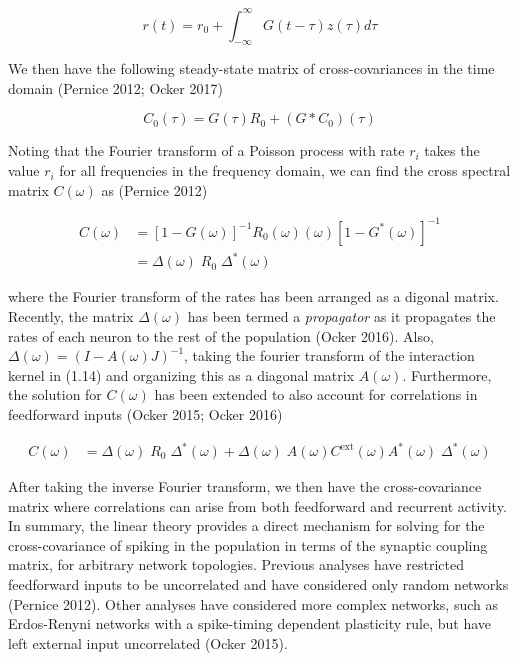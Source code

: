 \documentclass{ucetd}
\begin{document}
\begin{equation}
r(t) = r_{0} + \int_{-\infty}^{\infty} G(t-\tau)z(\tau)d\tau
\end{equation}

We then have the following steady-state matrix of cross-covariances in the time domain (Pernice 2012; Ocker 2017)

\begin{equation}
C_{0}(\tau) = G(\tau)R_{0} + (G*C_{0})(\tau)
\end{equation} 

Noting that the Fourier transform of a Poisson process with rate $r_{i}$ takes the value $r_{i}$ for all frequencies in the frequency domain, we can find the cross spectral matrix $C(\omega)$ as (Pernice 2012)

\begin{align}
C(\omega) &= [1-G(\omega)]^{-1}R_{0}(\omega)(\omega)[1-G^{*}(\omega)]^{-1}\\
&= \Delta(\omega)\;R_{0}\;\Delta^{*}(\omega)
\end{align} 

where the Fourier transform of the rates has been arranged as a digonal matrix. Recently, the matrix $\Delta(\omega)$ has been termed a \emph{propagator} as it propagates the rates of each neuron to the rest of the population (Ocker 2016). Also, $\Delta(\omega) = (I - A(\omega)J)^{-1}$, taking the fourier transform of the interaction kernel in (1.14) and organizing this as a diagonal matrix $A(\omega)$. Furthermore, the solution for $C(\omega)$ has been extended to also account for correlations in feedforward inputs (Ocker 2015; Ocker 2016)

\begin{align}
C(\omega) &= \Delta(\omega)\;R_{0}\;\Delta^{*}(\omega) + \Delta(\omega)\;A(\omega)C^{\mathrm{ext}}(\omega)A^{*}(\omega)\;\Delta^{*}(\omega)
\end{align} 
 
After taking the inverse Fourier transform, we then have the cross-covariance matrix where correlations can arise from both feedforward and recurrent activity. In summary, the linear theory provides a direct mechanism for solving for the cross-covariance of spiking in the population in terms of the synaptic coupling matrix, for arbitrary network topologies. Previous analyses have restricted feedforward inputs to be uncorrelated and have considered only random networks (Pernice 2012). Other analyses have considered more complex networks, such as Erdos-Renyni networks with a spike-timing dependent plasticity rule, but have left external input uncorrelated (Ocker 2015).
\end{document}
